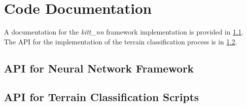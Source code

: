 \chapter{Code Documentation} \label{app:code_documentation}
A documentation for the \textit{kitt\_nn} framework implementation is provided in \cref{app:sec:api_kitt_nn}. The API for the implementation of the terrain classification process is in \cref{app:sec:api_scripts}.

\section{API for Neural Network Framework} \label{app:sec:api_kitt_nn}

\section{API for Terrain Classification Scripts} \label{app:sec:api_scripts}

